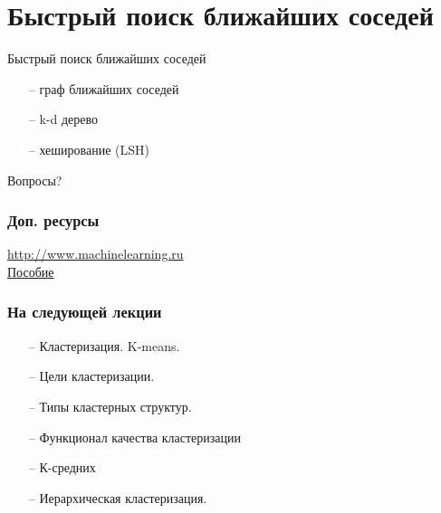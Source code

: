 \documentclass[10pt]{beamer}
\begin{document}
\section{Быстрый поиск ближайших соседей}

\begin{frame}{Быстрый поиск ближайших соседей}
	\begin{itemize}
		\item[--] граф ближайших соседей
		\item[--] k-d дерево
		\item[--] хеширование (LSH)
	\end{itemize}
\end{frame}

\begin{frame}[standout]
  Вопросы?
\end{frame}

\appendix


	
	

\begin{frame}\frametitle{Доп. ресурсы}
	\href{http://www.machinelearning.ru}{http://www.machinelearning.ru}\\
	\bigbreak
	\href{http://www.machinelearning.ru/wiki/images/6/6d/Voron-ML-1.pdf}{Пособие}
\end{frame}


\begin{frame}\frametitle{На следующей лекции}
	\begin{itemize}
		\item[--] Кластеризация.  K-means.
		\item[--] Цели кластеризации.
		\item[--] Типы кластерных структур.
		\item[--] Функционал качества кластеризации
		\item[--] К-средних
		\item[--] Иерархическая кластеризация.
	\end{itemize}
\end{frame}
\end{document}
